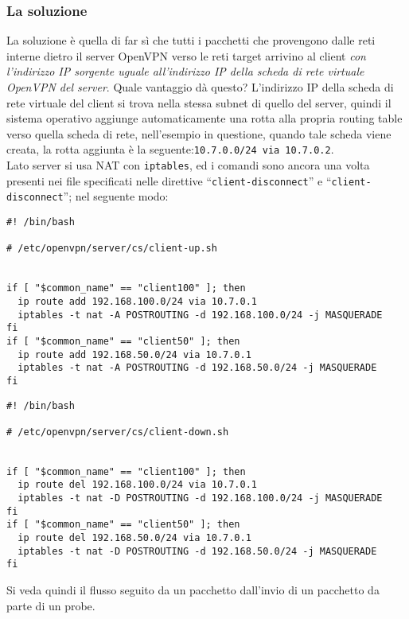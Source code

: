 \subsubsection{La soluzione}
La soluzione è quella di far sì che tutti i pacchetti che provengono dalle reti interne
dietro il server OpenVPN
verso le reti target arrivino al client \textit{con l'indirizzo IP sorgente uguale
all'indirizzo IP della scheda di rete virtuale OpenVPN del server}. Quale vantaggio dà questo?
L'indirizzo IP della scheda di rete virtuale del client si trova nella stessa subnet
di quello del server, quindi il sistema operativo aggiunge automaticamente una rotta
alla propria routing table verso quella scheda di rete, nell'esempio in questione, quando
tale scheda viene creata, la rotta aggiunta è la seguente:\texttt{10.7.0.0/24 via 10.7.0.2}.\\
Lato server si usa
NAT con \texttt{iptables}, ed i comandi sono ancora una volta presenti
nei file specificati nelle direttive ``\texttt{client-disconnect}'' e ``\texttt{client-disconnect}'';
nel seguente modo:
\begin{verbatim}
#! /bin/bash

# /etc/openvpn/server/cs/client-up.sh


if [ "$common_name" == "client100" ]; then
  ip route add 192.168.100.0/24 via 10.7.0.1
  iptables -t nat -A POSTROUTING -d 192.168.100.0/24 -j MASQUERADE
fi
if [ "$common_name" == "client50" ]; then
  ip route add 192.168.50.0/24 via 10.7.0.1
  iptables -t nat -A POSTROUTING -d 192.168.50.0/24 -j MASQUERADE
fi
\end{verbatim}
\begin{verbatim}
#! /bin/bash

# /etc/openvpn/server/cs/client-down.sh


if [ "$common_name" == "client100" ]; then
  ip route del 192.168.100.0/24 via 10.7.0.1
  iptables -t nat -D POSTROUTING -d 192.168.100.0/24 -j MASQUERADE
fi
if [ "$common_name" == "client50" ]; then
  ip route del 192.168.50.0/24 via 10.7.0.1
  iptables -t nat -D POSTROUTING -d 192.168.50.0/24 -j MASQUERADE
fi
\end{verbatim}
Si veda quindi il flusso
seguito da un pacchetto dall'invio di un pacchetto da parte di un probe.
